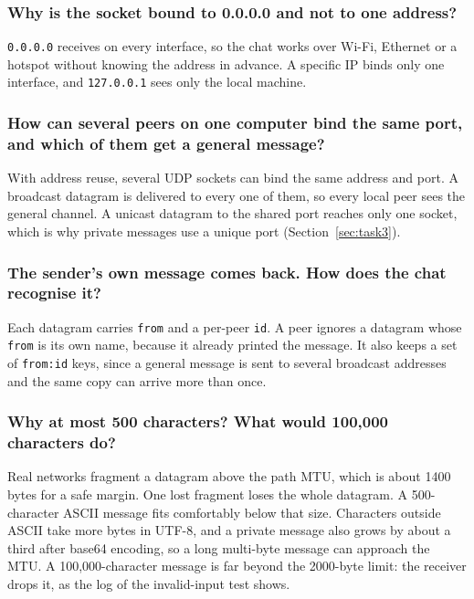 \documentclass[12pt,a4paper]{article}
\begin{document}
\subsubsection{Why is the socket bound to 0.0.0.0 and not to one address?}
\texttt{0.0.0.0} receives on every interface, so the chat works over Wi-Fi,
Ethernet or a hotspot without knowing the address in advance. A specific IP binds
only one interface, and \texttt{127.0.0.1} sees only the local machine.

\subsubsection{How can several peers on one computer bind the same port, and which of them get a general message?}
With address reuse, several UDP sockets can bind the same address and port. A
broadcast datagram is delivered to every one of them, so every local peer sees the
general channel. A unicast datagram to the shared port reaches only one socket,
which is why private messages use a unique port (Section~\ref{sec:task3}).

\subsubsection{The sender's own message comes back. How does the chat recognise it?}
Each datagram carries \texttt{from} and a per-peer \texttt{id}. A peer ignores a
datagram whose \texttt{from} is its own name, because it already printed the
message. It also keeps a set of \texttt{from:id} keys, since a general message is
sent to several broadcast addresses and the same copy can arrive more than once.

\subsubsection{Why at most 500 characters? What would 100,000 characters do?}
Real networks fragment a datagram above the path MTU, which is about 1400 bytes
for a safe margin. One lost fragment loses the whole datagram. A 500-character
ASCII message fits comfortably below that size. Characters outside ASCII take more
bytes in UTF-8, and a private message also grows by about a third after base64
encoding, so a long multi-byte message can approach the MTU. A 100,000-character
message is far beyond the 2000-byte limit: the receiver drops it, as the log of the
invalid-input test shows.

\end{document}
